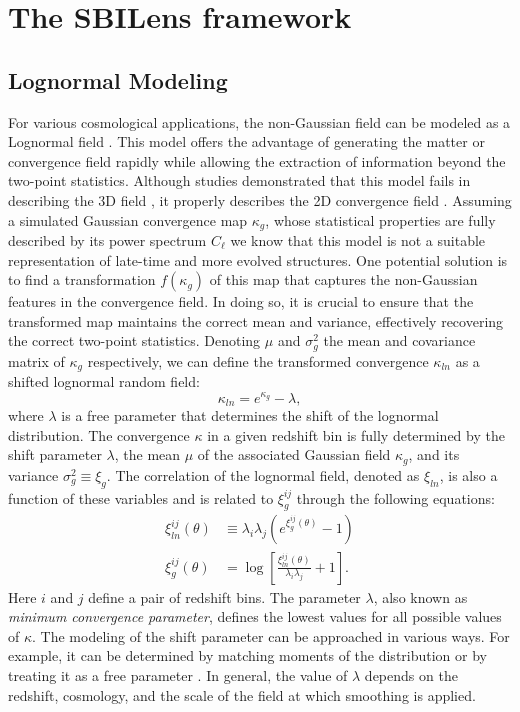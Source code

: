 \documentclass{aa}
\begin{document}
\section{The SBILens framework}\label{Sec:the SBILens framework}
\subsection{Lognormal Modeling}
For various cosmological applications, the non-Gaussian field can be modeled as a Lognormal field \citep{coles1991lognormal,bohm2017bayesian}.
This model offers the advantage of generating the matter or convergence field rapidly while allowing the extraction of information beyond the two-point statistics. 
Although studies demonstrated that this model fails in describing the 3D field \citep{klypin2018density}, it properly describes the 2D convergence field \citep{clerkin2017testing, xavier2016improving}.
Assuming a simulated Gaussian convergence map $\kappa_g$, whose statistical properties are fully described by its power spectrum $C_{\ell}$ we know that this model is not a suitable representation of late-time and more evolved structures. One potential solution is to find a transformation $f(\kappa_g)$ of this map that captures the non-Gaussian features in the convergence field. In doing so, it is crucial to ensure that the transformed map maintains the correct mean and variance, effectively recovering the correct two-point statistics.
Denoting $\mu$ and $\sigma_g^2$ the mean and covariance matrix of $\kappa_g$ respectively, we can define the transformed convergence $\kappa_{ln}$ as a shifted lognormal random field:
\begin{equation}\label{Eq:log_norm_kappa}
    \kappa_{ln}=e^{\kappa_{g}}-\lambda, 
\end{equation}
where $\lambda$ is a free parameter that determines the shift of the lognormal distribution. The convergence $\kappa$ in a given redshift bin is fully determined by the shift parameter $\lambda$, the mean $\mu$ of the associated Gaussian field $\kappa_g$, and its variance $\sigma_{g}^2\equiv \xi_g$.
The correlation of the lognormal field, denoted as $\xi_{ln}$, is also a function of these variables and is related to $\xi^{ij}_g$ through the following equations:
\begin{align}
    \xi^{ij}_{ln}(\theta) & \equiv \lambda_i \lambda_j (e^{ \xi^{ij}_g(\theta)}-1) \nonumber \\ 
    \xi^{ij}_g(\theta)&=\log{\left[ \frac{\xi^{ij}_{ln}(\theta)}{\lambda_i \lambda_j}+1\right ]}. \label{Eq:log_norm_corr}
\end{align}
Here $i$ and $j$ define a pair of redshift bins.
The parameter $\lambda$, also known as \textit{minimum convergence
parameter}, defines the lowest values for all possible values of $\kappa$.
The modeling of the shift parameter can be approached in various ways. For example, it can be determined by matching moments of the distribution \citep{xavier2016improving} or by treating it as a free parameter \citep{hilbert2011cosmic}. In general, the value of $\lambda$ depends on the redshift, cosmology, and the scale of the field at which smoothing is applied.
\end{document}
